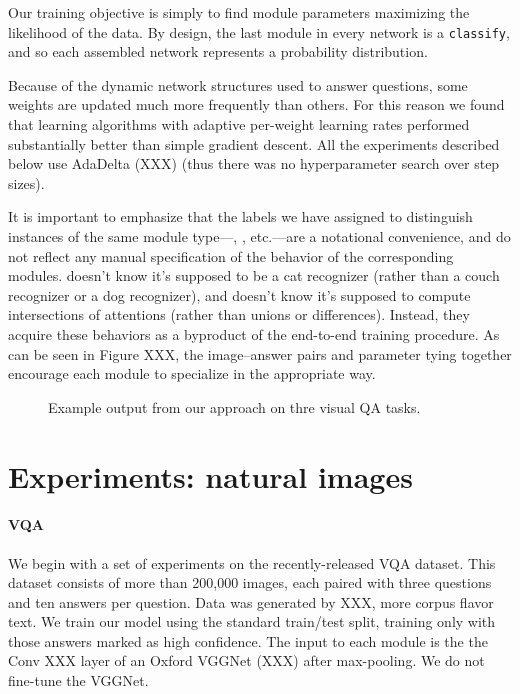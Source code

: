 \documentclass[10pt,twocolumn,letterpaper]{article}
\begin{document}
Our training objective is simply to find module parameters maximizing the
likelihood of the data. By design, the last module in every network is a
{\small\tt classify}, and so each assembled network represents a probability
distribution.

Because of the dynamic network structures used to answer questions, some weights
are updated much more frequently than others. For this reason we found that
learning algorithms with adaptive per-weight learning rates performed
substantially better than simple gradient descent. All the experiments described
below use AdaDelta (XXX) (thus there was no hyperparameter search over step
sizes).

It is important to emphasize that the labels we have assigned to distinguish
instances of the same module type---, , etc.---are a
notational convenience, and do not reflect any manual specification of the
behavior of the corresponding modules.  doesn't know it's
supposed to be a cat recognizer (rather than a couch recognizer or a dog
recognizer),
and  doesn't know it's supposed to compute intersections of
attentions (rather than unions or differences). Instead, they acquire these
behaviors as a byproduct of the end-to-end training procedure. As can be seen in
Figure XXX, the image--answer pairs and parameter tying together encourage each
module to specialize in the appropriate way.


\begin{figure}
  \caption{Example output from our approach on thre visual QA tasks.}
\end{figure}

\section{Experiments: natural images}

\paragraph{VQA}
We begin with a set of experiments on the recently-released VQA dataset. This
dataset consists of more than 200,000 images, each paired with three questions
and ten answers per question. Data was generated by XXX, more corpus flavor
text. We train our model using the standard train/test split, training only with
those answers marked as high confidence.
The input to each  module is the the Conv XXX layer of an Oxford
VGGNet (XXX) after max-pooling. We do not fine-tune the VGGNet.
\end{document}
